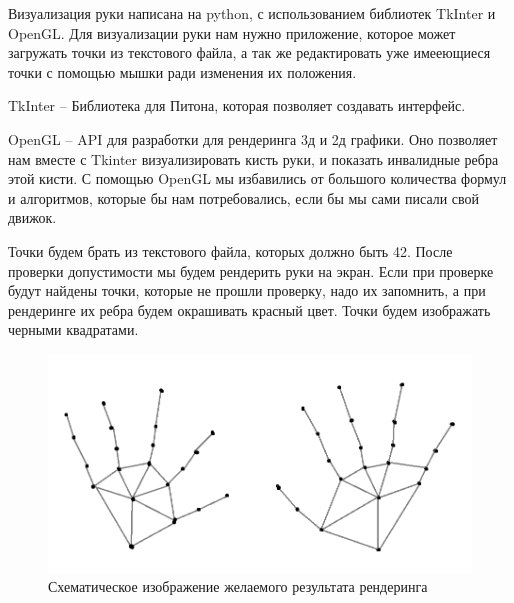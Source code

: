 \hspace{0.6cm} Визуализация руки написана на python, с использованием библиотек TkInter и OpenGL. Для визуализации руки нам нужно приложение, которое может загружать точки из текстового файла, а так же редактировать уже имееющиеся точки с помощью мышки ради изменения их положения.

\hspace{0.6cm} TkInter – Библиотека для Питона, которая позволяет создавать интерфейс.

\hspace{0.6cm} OpenGL – API для разработки для рендеринга 3д и 2д графики. Оно позволяет нам вместе с Tkinter визуализировать кисть руки, и показать инвалидные ребра этой кисти. С помощью OpenGL мы избавились от большого количества формул и алгоритмов, которые бы нам потребовались, если бы мы сами писали свой движок.

\hspace{0.6cm} Точки будем брать из текстового файла, которых должно быть 42. После проверки допустимости мы будем рендерить руки на экран. Если при проверке будут найдены точки, которые не прошли проверку, надо их запомнить, а при рендеринге их ребра будем окрашивать красный цвет. Точки будем изображать черными квадратами.

\begin{figure}[ht!]
	\centering
	\includegraphics[scale=0.65]{schematic.png}
	\caption{Схематическое изображение желаемого результата рендеринга}
	\label{fig:example4}
\end{figure}
	

